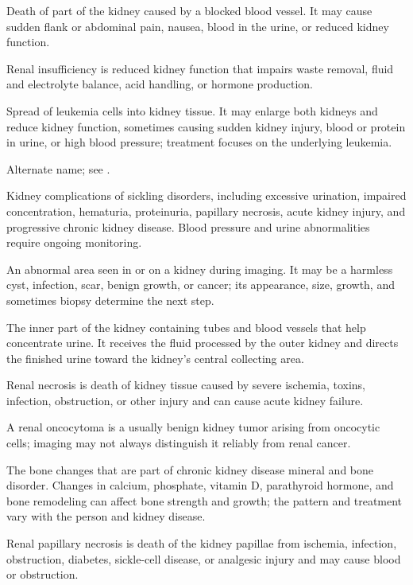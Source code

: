  Death of part of the kidney caused by a blocked blood vessel. It may cause sudden flank or abdominal pain, nausea, blood in the urine, or reduced kidney function.

 Renal insufficiency is reduced kidney function that impairs waste removal, fluid and electrolyte balance, acid handling, or hormone production.

 Spread of leukemia cells into kidney tissue. It may enlarge both kidneys and reduce kidney function, sometimes causing sudden kidney injury, blood or protein in urine, or high blood pressure; treatment focuses on the underlying leukemia.

 Alternate name; see .

 Kidney complications of sickling disorders, including excessive urination, impaired concentration, hematuria, proteinuria, papillary necrosis, acute kidney injury, and progressive chronic kidney disease. Blood pressure and urine abnormalities require ongoing monitoring.

 An abnormal area seen in or on a kidney during imaging. It may be a harmless cyst, infection, scar, benign growth, or cancer; its appearance, size, growth, and sometimes biopsy determine the next step.

 The inner part of the kidney containing tubes and blood vessels that help concentrate urine. It receives the fluid processed by the outer kidney and directs the finished urine toward the kidney’s central collecting area.

 Renal necrosis is death of kidney tissue caused by severe ischemia, toxins, infection, obstruction, or other injury and can cause acute kidney failure.

 A renal oncocytoma is a usually benign kidney tumor arising from oncocytic cells; imaging may not always distinguish it reliably from renal cancer.

 The bone changes that are part of chronic kidney disease mineral and bone disorder. Changes in calcium, phosphate, vitamin D, parathyroid hormone, and bone remodeling can affect bone strength and growth; the pattern and treatment vary with the person and kidney disease.

 Renal papillary necrosis is death of the kidney papillae from ischemia, infection, obstruction, diabetes, sickle-cell disease, or analgesic injury and may cause blood or obstruction.

